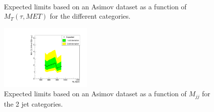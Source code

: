 \begin{figure}[htbp] 
     \centering
     \\
     \caption{Expected limits based on an Asimov dataset as a function of $M_T(\tau, MET)$ for the different categories.}
     \label{fig:optMT}
\end{figure}

\begin{figure}[!tbp] 
\centering
\includegraphics[width=0.4\textwidth]{chapter5/Tuning/vbf_vbfvbfMass.pdf}
\caption{Expected limits based on an Asimov dataset as a function of $M_{jj}$ for the 2 jet categories.}
\label{fig:optVBFmass}
\end{figure}



